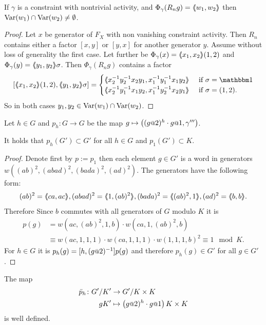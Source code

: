 \documentclass[a4paper,11pt]{amsart}
\begin{document}
\begin{lem} \label{lem:commonVar}
 If $\gamma$ is a constraint with nontrivial activity, and $\Phi_\gamma(R_ng)=\langle\negthickspace\langle w_1,w_2\rangle\negthickspace\rangle$ then $\textup{Var}(w_1)\cap\textup{Var}(w_2)\neq \emptyset$.
\end{lem}
\begin{proof}
 Let $x$ be generator of $F_X$ with non vanishing constraint activity. 
 Then $R_n$ contains either a factor $[x,y]$ or $[y,x]$ for another generator $y$. Assume without loss of generality the first case.
 Let further be $\Phi_\gamma(x)=\langle\negthickspace\langle x_1,x_2\rangle\negthickspace\rangle(1,2)$ and $\Phi_\gamma(y)=\langle\negthickspace\langle y_1,y_2\rangle\negthickspace\rangle\sigma$. 
 Then $\Phi_\gamma(R_n g)$ contains a factor 
 \[ [\pair{x_1,x_2}(1,2),\pair{y_1,y_2}\sigma] = \begin{cases}
                                                   \pair{x_2^{-1}y_2^{-1}x_2y_1,x_1^{-1}y_1^{-1}x_1y_2} & \textup{ if } \sigma=\id \\
                                                   \pair{x_2^{-1}y_1^{-1}x_1y_2,x_1^{-1}y_2^{-1}x_2y_1} & \textup{ if } \sigma=(1,2) . \\
                                                 \end{cases}
\] So in both cases $y_1,y_2\in \textup{Var}(w_1)\cap \textup{Var}(w_2)$. 
\end{proof}
\begin{lem} \label{lem:productOfStatesIsInDerived} 
 Let $h\in G$ and $p_h\colon G\to G$ be the map $g\mapsto \left((g\at{2})^{h}\cdot g\at{1},\gamma'''\right)$.
 
 It holds that $p_h(G')\subset G'$ for all $h\in G$ and $p_1(G')\subset K$. 
\end{lem}
\begin{proof}
 Denote first by $p:=p_1$ then
 each element $g\in G'$ is a word in generators $w((ab)^2,(abad)^2,(bada)^2,(ad)^2)$. 
 The generators have the following form:
 \[(ab)^2=\pair{ca,ac}, (abad)^2 = \pair{1,(ab)^2}, (bada)^2=\pair{(ab)^2,1}, (ad)^2=\pair{b,b}.\]
 Therefore Since $b$ commutes with all generators of $G$ modulo $K$ it is
 \begin{align*}
  p(g) &= w(ac,(ab)^2,1,b) \cdot w(ca,1,(ab)^2,b)\\ &\equiv w(ac,1,1,1) \cdot w(ca,1,1,1) \cdot w(1,1,1,b)^2 \equiv 1 \mod K.
 \end{align*}
 For $h\in G$ it is $p_h(g)=[h,(g\at{2})^{-1}]p(g)$ and therefore $p_h(g)\in G'$ for all $g\in G'$.
\end{proof}
\begin{lem} \label{lem:pIsDefinedModK'}
 The map 
 \begin{align*} 
  \bar p_h\colon \RNK{G'}{K'} &\to \RNK{G'}{K\times K}\\
  gK'&\mapsto \left(g\at{2})^h\cdot g\at{1}\right){K\times K}
 \end{align*}
is well defined.
\end{lem}
\end{document}
